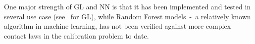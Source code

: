 One major strength of GL and NN is that it has been implemented and tested in several use case (see~\cite{gl-performancestudy,gl-quantification} for GL), while Random Forest models~-~a relatively known algorithm in machine learning, has not been verified against more complex contact laws in the calibration problem to date. 